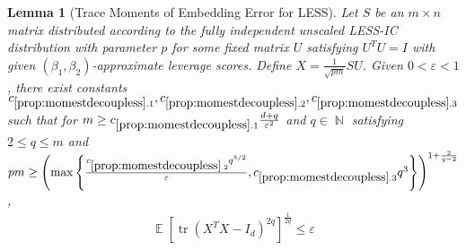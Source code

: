 \documentclass[11pt]{amsart}
\numberwithin{equation}{section}
\numberwithin{equation}{section}
\DeclareMathOperator{\E}{\mathbb{E}}
\DeclareMathOperator{\N}{\mathbb{N}}
\DeclareMathOperator*{\tr}{tr}
\DeclarePairedDelimiter{\paren}{(}{)}
\newtheorem{lemma}[theorem]{Lemma}
\theoremstyle{remark}
\theoremstyle{definition}
\begin{document}
\begin{lemma} [Trace Moments of Embedding Error for LESS]\label{prop:momestdecoupless}
Let $S$ be an $m \times n$ matrix distributed according to the fully independent unscaled LESS-IC distribution with parameter $p$ for some fixed matrix $U$ satisfying $U^TU=I$ with given $(\beta_1, \beta_2)$-approximate leverage scores. Define $X = \frac{1}{\sqrt{pm}}SU$. Given $0< \varepsilon < 1$, there exist constants $c_{\ref*{prop:momestdecoupless}.1}, c_{\ref*{prop:momestdecoupless}.2}, c_{\ref*{prop:momestdecoupless}.3}$ such that for $m \geq c_{\ref*{prop:momestdecoupless}.1} \frac{d+q}{\varepsilon^2}$ and $q \in \N$ satisfying $2 \le q \le m$ and $ pm \ge \paren*{ \max \left\{ \frac{c_{\ref*{prop:momestdecoupless}.2} q^{5/2}}{\varepsilon}, c_{\ref*{prop:momestdecoupless}.3}  q^3 \right\}}^{1+\frac{2}{q-2}} $ ,
\begin{align*} \E[\tr(X^TX - I_d)^{2q}]^\frac{1}{2q} \leq  \varepsilon \end{align*}
\end{lemma}
\end{document}
